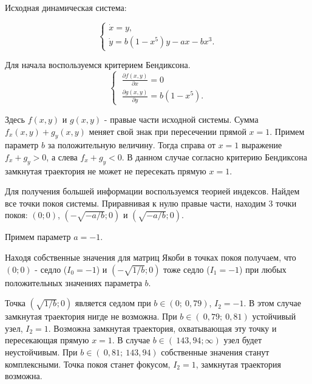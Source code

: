 \documentclass[10pt,a4paper]{article}
\begin{document}
	Исходная динамическая система:

	\begin{equation}
		\label{math/1}
		\begin{cases}
			\dot{x} = y, \\
			\dot{y} = b(1-x^{5})y - a x - b x^3.
		\end{cases}
	\end{equation}

	Для начала воспользуемся критерием Бендиксона.
	\begin{equation}
		\label{math/2}
		\begin{cases}
			\ \frac{\partial f(x, y)}{\partial x} = 0 \\
			\ \frac{\partial g(x, y)}{\partial y} = b(1 - x^5).
		\end{cases}
	\end{equation}
	
	Здесь $f(x,y)$ и $g(x,y)$ - правые части исходной системы. Сумма $f_x(x,y) + g_y(x,y)$ меняет свой знак при пересечении прямой $x = 1$. Примем параметр $b$ за положительную величину. Тогда справа от $x = 1$ выражение $f_x + g_y > 0$, а слева $f_x + g_y < 0$. В данном случае согласно критерию Бендиксона замкнутая траектория не может не пересекать прямую $x = 1$.
	
	Для получения большей информации воспользуемся теорией индексов. Найдем все точки покоя системы. Приравнивая к нулю правые части, находим 3 точки покоя: $(0;0)$, $(-\sqrt{-a/b}; 0)$ и $(\sqrt{-a/b}; 0)$.
	
	Примем параметр $a = -1$.
	
	Находя собственные значения для матриц Якоби в точках покоя получаем, что $(0;0)$ - седло ($I_0 = -1$) и  $(-\sqrt{1/b}; 0)$ тоже седло ($I_1 = -1$) при любых положительных значениях параметра $b$.
	
	Точка $(\sqrt{1/b}; 0)$ является седлом при $b \in (0; ~0,79)$, $I_2 = -1$. В этом случае замкнутая траектория нигде не возможна. При $b \in (~0,79; ~0,81)$ устойчивый узел, $I_2 = 1$. Возможна замкнутая траектория, охватывающая эту точку и пересекающая прямую $x = 1$. В случае $b \in (~143,94; \infty)$ узел будет неустойчивым. При $b \in (~0,81; ~143,94)$ собственные значения станут комплексными. Точка покоя станет фокусом, $I_2 = 1$, замкнутая траектория возможна.
	
\end{document}
